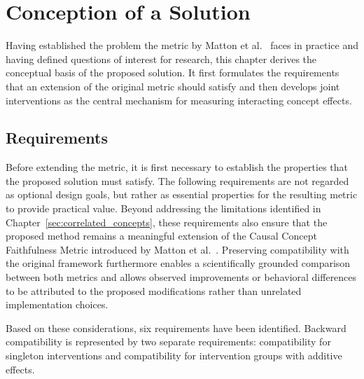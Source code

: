 \chapter{Conception of a Solution}
\label{sec:conception}
Having established the problem the metric by Matton et al.~\cite{mattonWalkTalkMeasuring2024} faces in practice and having defined questions of interest for research, this chapter derives the conceptual basis of the proposed solution. It first formulates the requirements that an extension of the original metric should satisfy and then develops joint interventions as the central mechanism for measuring interacting concept effects.

\section{Requirements}
\label{sec:requirements}
Before extending the metric, it is first necessary to establish the properties that the proposed solution must satisfy. The following requirements are not regarded as optional design goals, but rather as essential properties for the resulting metric to provide practical value. Beyond addressing the limitations identified in Chapter~\ref{sec:correlated_concepts}, these requirements also ensure that the proposed method remains a meaningful extension of the Causal Concept Faithfulness Metric introduced by Matton et al.~\cite{mattonWalkTalkMeasuring2024}. Preserving compatibility with the original framework furthermore enables a scientifically grounded comparison between both metrics and allows observed improvements or behavioral differences to be attributed to the proposed modifications rather than unrelated implementation choices.

Based on these considerations, six requirements have been identified. Backward compatibility is represented by two separate requirements: compatibility for singleton interventions and compatibility for intervention groups with additive effects.

